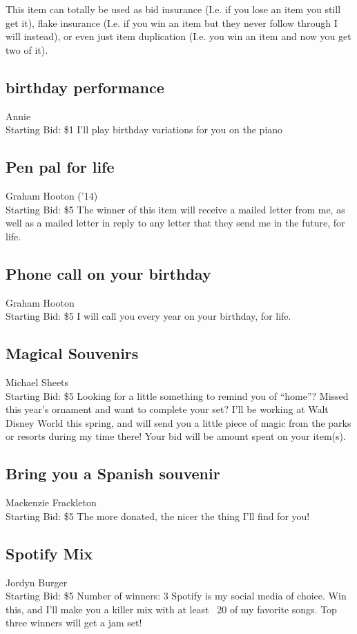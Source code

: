 \documentclass[11pt]{article}
\begin{document}
This item can totally be used as bid insurance (I.e. if you lose an item you still get it), flake insurance (I.e. if you win an item but they never follow through I will instead), or even just item duplication (I.e. you win an item and now you get two of it).
\subsection{birthday performance}
Annie 
\\
Starting Bid: \$1
\newline
I'll play birthday variations for you on the piano
\subsection{Pen pal for life}
Graham Hooton ('14)
\\
Starting Bid: \$5
\newline
The winner of this item will receive a mailed letter from me, as well as a mailed letter in reply to any letter that they send me in the future, for life.
\subsection{Phone call on your birthday}
Graham Hooton
\\
Starting Bid: \$5
\newline
I will call you every year on your birthday, for life.
\subsection{Magical Souvenirs}
Michael Sheets
\\
Starting Bid: \$5
\newline
Looking for a little something to remind you of “home”? Missed this year’s ornament and want to complete your set? I’ll be working at Walt Disney World this spring, and will send you a little piece of magic from the parks or resorts during my time there! Your bid will be amount spent on your item(s).
\subsection{Bring you a Spanish souvenir }
Mackenzie Frackleton
\\
Starting Bid: \$5
\newline
The more donated, the nicer the thing I'll find for you!
\subsection{Spotify Mix}
Jordyn Burger
\\
Starting Bid: \$5
\newline
Number of winners: 3
\newline
Spotify is my social media of choice. Win this, and I'll make you a killer mix with at least ~20 of my favorite songs. Top three winners will get a jam set!
\end{document}
